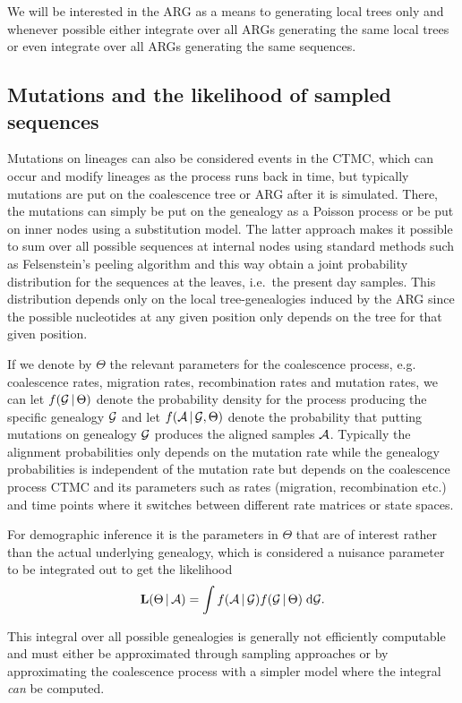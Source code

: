 We will be interested in the ARG as a means to generating local trees only and whenever possible either integrate over all ARGs generating the same local trees or even integrate over all ARGs generating the same sequences.


\subsection{Mutations and the likelihood of sampled sequences}

Mutations on lineages can also be considered events in the CTMC, which can occur and modify lineages as the process runs back in time, but typically mutations are put on the coalescence tree or ARG after it is simulated. There, the mutations can simply be put on the genealogy as a Poisson process or be put on inner nodes using a substitution model. The latter approach makes it possible to sum over all possible sequences at internal nodes using standard methods such as Felsenstein's peeling algorithm \cite{Felsenstein_1981} and this way obtain a joint probability distribution for the sequences at the leaves, i.e.\ the present day samples. This distribution depends only on the local tree-genealogies induced by the ARG since the possible nucleotides at any given position only depends on the tree for that given position.

If we denote by $\Theta$ the relevant parameters for the coalescence process, e.g. coalescence rates, migration rates, recombination rates and mutation rates, we can let $f(\mathcal{G}\,|\,\Theta)$ denote the probability density for the process producing the specific genealogy $\mathcal{G}$ and let $f(\mathcal{A}\,|\,\mathcal{G},\Theta)$ denote the probability that putting mutations on genealogy $\mathcal{G}$ produces the aligned samples $\mathcal{A}$. Typically the alignment probabilities only depends on the mutation rate while the genealogy probabilities is independent of the mutation rate but depends on the coalescence process CTMC and its parameters such as rates (migration, recombination etc.) and time points where it switches between different rate matrices or state spaces.

For demographic inference it is the parameters in $\Theta$ that are of interest rather than the actual underlying genealogy, which is considered a nuisance parameter to be integrated out to get the likelihood
\[
    \mathbf{L}(\Theta\,|\,\mathcal{A}) = \int f(\mathcal{A}\,|\,\mathcal{G}) f(\mathcal{G}\,|\,\Theta) \mathrm{\;d}\mathcal{G} .
\]

This integral over all possible genealogies is generally not efficiently computable and must either be approximated through sampling approaches or by approximating the coalescence process with a simpler model where the integral \emph{can} be computed. 

